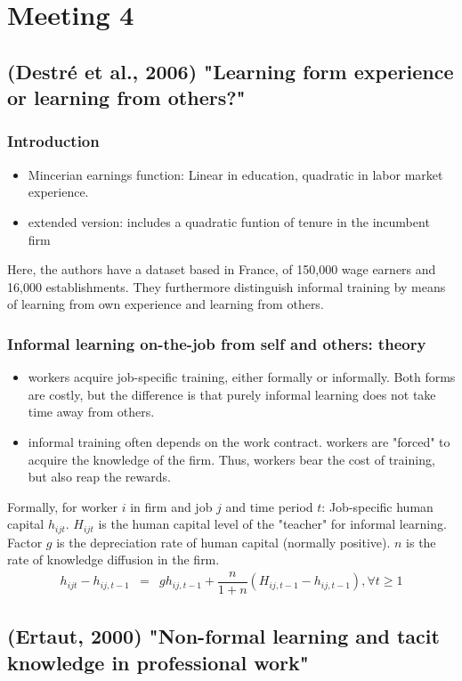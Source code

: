 \documentclass[12pt,a4paper]{article}
\begin{document}
  \section{Meeting 4} %
  \label{prt:Meeting 4}
  \subsection{(Destré et al., 2006) "Learning form experience or learning from others?"} %
  \label{sec:Destré et al., 2006}
  \setcounter{equation}{0}
  \subsubsection{Introduction} %
  \label{ssub:Introduction}
  \begin{itemize}
    \item Mincerian earnings function: Linear in education, quadratic in labor market experience.
    \item extended version: includes a quadratic funtion of tenure in the incumbent firm
  \end{itemize}
  Here, the authors have a dataset based in France, of 150,000 wage earners and 16,000
  establishments. They furthermore distinguish informal training by means of learning from own
  experience and learning from others.

  \subsubsection{Informal learning on-the-job from self and others: theory} %
  \label{ssub:Informal learning on-the-job from self and others: theory}
  \begin{itemize}
    \item workers acquire job-specific training, either formally or informally. Both forms are
      costly, but the difference is that purely informal learning does not take time away from
      others.
    \item informal training often depends on the work contract. workers are "forced" to acquire the
      knowledge of the firm. Thus, workers bear the cost of training, but also reap the rewards.
  \end{itemize}
  Formally, for worker $i$ in firm and job $j$ and time period $t$: Job-specific human capital
  $h_{ijt}$. $H_{ijt}$ is the human capital level of the "teacher" for informal learning. Factor
  $g$ is the depreciation rate of human capital (normally positive). $n$ is the rate of knowledge
  diffusion in the firm.
  \begin{eqnarray}
    h_{ijt}- h_{ij,t-1} &=& gh_{ij,t-1}+ \dfrac{n}{1+n}(H_{ij,t-1} - h_{ij,t-1} ), \forall t \geq
    1
  \end{eqnarray}

  \subsection{(Ertaut, 2000) "Non-formal learning and tacit knowledge in professional work"} %
  \label{sec:(Ertaut, 2000}




\end{document}
